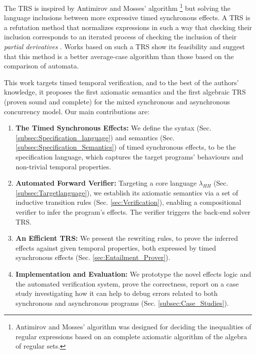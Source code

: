 \documentclass[acmsmall,review,anonymous]{acmart}\settopmatter{printfolios=true,printccs=false,printacmref=false}
\newcommand{\code}[1]{{\tt{\ensuremath{\m{#1}}}}}
\newcommand{\m}{\mathit}
\newcommand\secref[1]{Sec. \textcolor{black}{\ref{#1}}}
\begin{document}
The TRS  is inspired by Antimirov and Mosses’ algorithm \cite{antimirov1995rewriting}\footnote{Antimirov and Mosses' algorithm was designed for deciding the inequalities of regular expressions based on an 
complete 
axiomatic algorithm of the algebra of regular sets.} but solving the language inclusions between more expressive timed synchronous effects.  A TRS is a refutation method that normalizes expressions in such a way that checking their inclusion corresponds to an iterated process of checking the inclusion of their \emph{partial derivatives} \cite{antimirov1995partial}. 
Works based on such a TRS \cite{song2020automated,antimirov1995rewriting,almeida2009antimirov,keil2014symbolic,hovland2012inclusion}  show its feasibility and suggest that this method is a better average-case algorithm than those based on the comparison of automata. 


This work targets timed temporal verification, and to the best of the authors’ knowledge, it proposes the first axiomatic semantics and the first algebraic TRS (proven sound and complete) for the mixed synchronous and asynchronous concurrency model.  Our main contributions are:%



\begin{enumerate}
\item \textbf{The Timed Synchronous Effects:} We define the syntax ({\secref{subsec:Specification_language}}) and semantics ({\secref{subsec:Specification_Semantics}}) of timed synchronous effects, to be the specification language, which captures the target programs' behaviours and non-trivial temporal properties.

\item \textbf{Automated Forward Verifier:} Targeting a core language \code{\lambda_{HH}} ({\secref{subsec:Targetlanguage}}), we 
establish its axiomatic semantics via a set of inductive transition rules (\secref{sec:Verification}), enabling a compositional verifier to infer the program's effects. The verifier triggers the back-end solver TRS. 


\item \textbf{An Efficient TRS:}
We present the rewriting rules, to prove 
the inferred effects against given temporal properties, both expressed by timed synchronous effects (\secref{sec:Entailment_Prover}). 


\item \textbf{Implementation and Evaluation:} We prototype the novel effects logic and the automated verification system, %
prove the correctness, report on a case study investigating how it can help to debug errors related to both synchronous and asynchronous programs (\secref{subsec:Case_Studies}).


\end{enumerate} 
\end{document}
